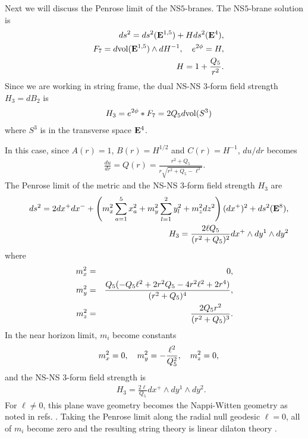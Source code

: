 \documentclass[a4paper,12pt]{article}
\begin{document}
\vspace{2mm}
\vspace{1mm}

Next we will discuss the Penrose limit of the NS$5$-branes.
The NS$5$-brane solution is
\cite{CaHaSt}
\begin{eqnarray}
&&ds^2=ds^2({\bf E}^{1,5})+H ds^2({\bf E}^{4}), \nonumber \\
&&F_{7}=d{\rm vol}({\bf E}^{1,5})\wedge dH^{-1}, \quad
e^{2\phi}=H,  \nonumber \\
&&H=1+\frac{Q_5}{r^2}. 
\end{eqnarray}
Since we are working in string frame,
the dual NS-NS $3$-form field strength $H_3=dB_2$ is
\begin{eqnarray}
&&H_3=e^{2\phi}*F_7=2Q_5d{\rm vol}(S^3)
\end{eqnarray}
where $S^3$ is in the transverse space ${\bf E}^4$.

In this case, since $A(r)=1$, $B(r)=H^{1/2}$ and $C(r)=H^{-1}$,
$du/dr$ becomes
\begin{eqnarray}
\frac{du}{dr}=Q(r)=\frac{r^2+Q_{5}}{r\sqrt{r^2+Q_{5}-\ell^2}}.
\label{QNS5}
\end{eqnarray}
The Penrose limit of the metric and the NS-NS $3$-form field strength $H_3$ are
\begin{eqnarray}
&&ds^2=2dx^+dx^-+\left(
m_x^2\sum_{a=1}^{5}x_a^2 +m_y^2\sum_{l=1}^{2}y_{l}^2
+m_z^2dz^2
\right)(dx^{+})^2
+ds^2({\bf E}^{8}),\nonumber \\
&&
H_{3}= \frac{2\ell Q_5}{(r^2+Q_5)^2}
dx^+\wedge dy^1\wedge dy^2
\end{eqnarray}
where
\begin{eqnarray}
m^{2}_{x}&=&0, \nonumber\\
m^2_{y}&=& {Q_{5}(-Q_{5}\ell^2+2r^2 Q_{5}-4r^2\ell^2+2r^4)\over 
(r^2+Q_{5})^4},\nonumber\\
m^{2}_{z}&=& {2 Q_{5}r^2\over (r^2+Q_{5})^3}.
\label{eq:NS5mass}
\end{eqnarray}
In the near horizon limit, $m_i$ become constants
\begin{eqnarray}
&&m^{2}_{x}=0,\quad 
m^2_{y}= -{\ell^2\over Q_{5}^2},\quad
m^{2}_{z}= 0,\label{NHL:NS5mass}
\end{eqnarray}
and the NS-NS $3$-form field strength is
\begin{eqnarray}
&&H_{3}= \frac{2\ell}{{Q_5}}dx^+\wedge dy^1\wedge dy^2.
\end{eqnarray}
For $\ell \ne 0$,
this plane wave geometry becomes the Nappi-Witten 
geometry \cite{NaWi}
as noted in refs. \cite{Go-Oo,KiPi}.
Taking the Penrose limit along the radial null geodesic $\ell=0$, 
all of $m_i$ become zero and 
the resulting string theory is linear dilaton theory \cite{BlFiPa}.
\end{document}
